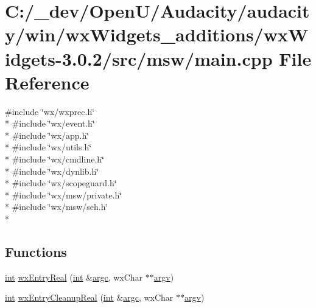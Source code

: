 \hypertarget{win_2wx_widgets__additions_2wx_widgets-3_80_82_2src_2msw_2main_8cpp}{}\section{C\+:/\+\_\+dev/\+Open\+U/\+Audacity/audacity/win/wx\+Widgets\+\_\+additions/wx\+Widgets-\/3.0.2/src/msw/main.cpp File Reference}
\label{win_2wx_widgets__additions_2wx_widgets-3_80_82_2src_2msw_2main_8cpp}
{\ttfamily \#include \char`\"{}wx/wxprec.\+h\char`\"{}}\\*
{\ttfamily \#include \char`\"{}wx/event.\+h\char`\"{}}\\*
{\ttfamily \#include \char`\"{}wx/app.\+h\char`\"{}}\\*
{\ttfamily \#include \char`\"{}wx/utils.\+h\char`\"{}}\\*
{\ttfamily \#include \char`\"{}wx/cmdline.\+h\char`\"{}}\\*
{\ttfamily \#include \char`\"{}wx/dynlib.\+h\char`\"{}}\\*
{\ttfamily \#include \char`\"{}wx/scopeguard.\+h\char`\"{}}\\*
{\ttfamily \#include \char`\"{}wx/msw/private.\+h\char`\"{}}\\*
{\ttfamily \#include \char`\"{}wx/msw/seh.\+h\char`\"{}}\\*
\subsection*{Functions}
\begin{DoxyCompactItemize}
\item 
\hyperlink{xmltok_8h_a5a0d4a5641ce434f1d23533f2b2e6653}{int} \hyperlink{win_2wx_widgets__additions_2wx_widgets-3_80_82_2src_2msw_2main_8cpp_a716ae3b041bd3f155c92b56496bb698e}{wx\+Entry\+Real} (\hyperlink{xmltok_8h_a5a0d4a5641ce434f1d23533f2b2e6653}{int} \&\hyperlink{cmdline_8c_aaffeb1bf2056ea44af5b5d0ee4d6ff07}{argc}, wx\+Char $\ast$$\ast$\hyperlink{cmdline_8c_ad407d5ba91709bd9b092003858600723}{argv})
\item 
\hyperlink{xmltok_8h_a5a0d4a5641ce434f1d23533f2b2e6653}{int} \hyperlink{win_2wx_widgets__additions_2wx_widgets-3_80_82_2src_2msw_2main_8cpp_ad2081e8ec8346d848761e45315c73a25}{wx\+Entry\+Cleanup\+Real} (\hyperlink{xmltok_8h_a5a0d4a5641ce434f1d23533f2b2e6653}{int} \&\hyperlink{cmdline_8c_aaffeb1bf2056ea44af5b5d0ee4d6ff07}{argc}, wx\+Char $\ast$$\ast$\hyperlink{cmdline_8c_ad407d5ba91709bd9b092003858600723}{argv})
\end{DoxyCompactItemize}


